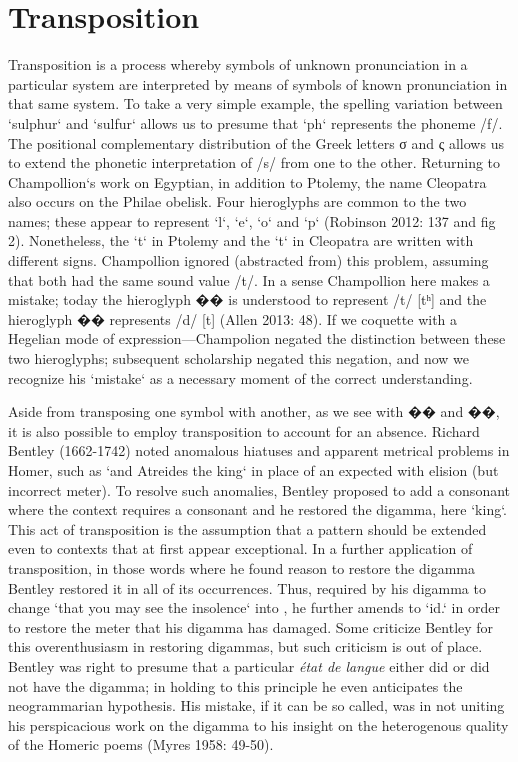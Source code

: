 \section{Transposition} 
Transposition is a process whereby symbols of unknown pronunciation in a particular system are interpreted by means of symbols of known pronunciation in that same system. To take a very simple example, the spelling variation between `sulphur` and `sulfur` allows us to presume that `ph` represents the phoneme /f/. The positional complementary distribution of the Greek letters σ and ς allows us to extend the phonetic interpretation of /s/ from one to the other. Returning to Champollion`s work on Egyptian, in addition to Ptolemy, the name Cleopatra also occurs on the Philae obelisk. Four hieroglyphs are common to the two names; these appear to represent `l`, `e`, `o` and `p` (Robinson 2012: 137 and fig 2). Nonetheless, the `t` in Ptolemy and the `t` in Cleopatra are written with different signs. Champollion ignored (abstracted from) this problem, assuming that both had the same sound value /t/. In a sense Champollion here makes a mistake; today the hieroglyph �� is understood to represent /t/ [tʰ] and the hieroglyph �� represents /d/ [t] (Allen 2013: 48). If we coquette with a Hegelian mode of expression—Champolion negated the distinction between these two hieroglyphs; subsequent scholarship negated this negation, and now we recognize his `mistake` as a necessary moment of the correct understanding. 

Aside from transposing one symbol with another, as we see with �� and ��, it is also possible to employ transposition to account for an absence. Richard Bentley (1662-1742) noted anomalous hiatuses and apparent metrical problems in Homer, such as {} `and Atreides the king` in place of an expected {} with elision (but incorrect meter).  To resolve such anomalies, Bentley proposed to add a consonant where the context requires a consonant and he restored the digamma, here {} `king`. This act of transposition is the assumption that a pattern should be extended even to contexts that at first appear exceptional. In a further application of transposition, in those words where he found reason to restore the digamma Bentley restored it in all of its occurrences. Thus, required by his digamma to change {} `that you may see the insolence` into {}, he further amends to {} `id.` in order to restore the meter that his digamma has damaged. Some criticize Bentley for this overenthusiasm in restoring digammas,  but such criticism is out of place. Bentley was right to presume that a particular \textit{état de langue} either did or did not have the digamma; in holding to this principle he even anticipates the neogrammarian hypothesis. His mistake, if it can be so called, was in not uniting his perspicacious work on the digamma to his insight on the heterogenous quality of the Homeric poems (Myres 1958: 49-50). 

